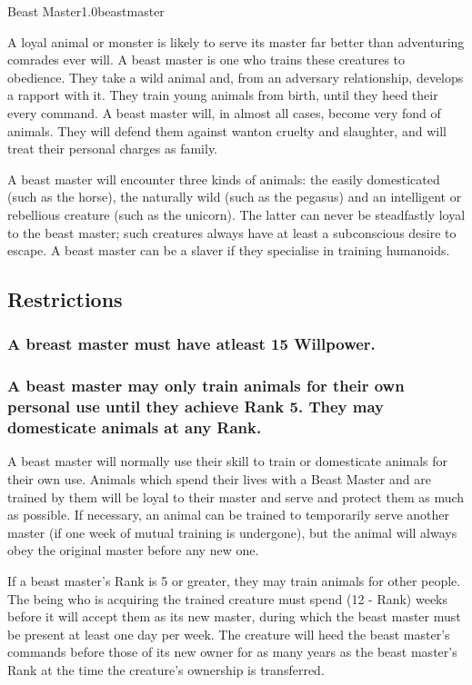 \begin{skill}{Beast Master}{1.0}{beastmaster}

A loyal animal or monster is likely to serve its master far better
than adventuring comrades ever will.  A beast master is one who trains
these creatures to obedience.  They take a wild animal and, from an
adversary relationship, develops a rapport with it.  They train young
animals from birth, until they heed their every command.  A beast
master will, in almost all cases, become very fond of animals.  They
will defend them against wanton cruelty and slaughter, and will treat
their personal charges as family.

A beast master will encounter three kinds of animals: the easily
domesticated (such as the horse), the naturally wild (such as the
pegasus) and an intelligent or rebellious creature (such as the
unicorn).  The latter can never be steadfastly loyal to the beast
master; such creatures always have at least a subconscious desire to
escape.  A beast master can be a slaver if they specialise in training
humanoids.

\subsection{Restrictions}

\subsubsection{A breast master must have atleast 15 Willpower.}

\subsubsection{A beast master may only train animals for their own
personal use until they achieve Rank 5. They may domesticate animals at
any Rank.}

A beast master will normally use their skill to train or domesticate
animals for their own use.  Animals which spend their lives with a
Beast Master and are trained by them will be loyal to their master and
serve and protect them as much as possible.  If necessary, an animal
can be trained to temporarily serve another master (if one week of
mutual training is undergone), but the animal will always obey the
original master before any new one.

If a beast master's Rank is 5 or greater, they may train animals for
other people.  The being who is acquiring the trained creature must
spend (12 - Rank) weeks before it will accept them as its new master,
during which the beast master must be present at least one day per
week.  The creature will heed the beast master's commands before those
of its new owner for as many years as the beast master's Rank at the
time the creature's ownership is transferred.


\end{skill}
